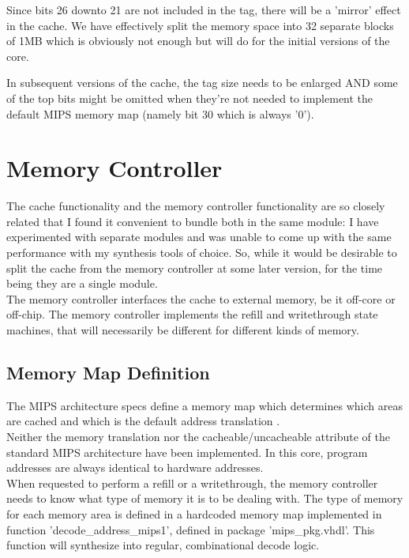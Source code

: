     Since bits 26 downto 21 are not included in the tag, there will be a 
    'mirror' effect in the cache. We have effectively split the memory space 
    into 32 separate blocks of 1MB which is obviously not enough but will do
    for the initial versions of the core.
    
    In subsequent versions of the cache, the tag size needs to be enlarged AND 
    some of the top bits might be omitted when they're not needed to implement 
    the default MIPS memory map (namely bit 30 which is always '0').

    
\section{Memory Controller}
\label{memory_controller}

    The cache functionality and the memory controller functionality are so 
    closely related that I found it convenient to bundle both in the same 
    module: I have experimented with separate modules and was unable to come up
    with the same performance with my synthesis tools of choice.
    So, while it would be desirable to split the cache from the memory controller
    at some later version, for the time being they are a single module.\\

    The memory controller interfaces the cache to external memory, be it off-core 
    or off-chip.
    The memory controller implements the refill and writethrough state machines,
    that will necessarily be different for different kinds of memory.\\


\subsection{Memory Map Definition}
\label{memory_map_definition}    
    
    The MIPS architecture specs define a memory map which determines which areas
    are cached and which is the default address translation \cite[p.~2-8]{r3k_ref_man}.\\
    Neither the memory translation nor the cacheable/uncacheable attribute of
    the standard MIPS architecture have been implemented. In this core, program 
    addresses are always identical to hardware addresses.\\

    When requested to perform a refill or a writethrough, the memory controller 
    needs to know what type of memory it is to be dealing with. The type of
    memory for each memory area is defined in a hardcoded memory map 
    implemented in function 'decode\_address\_mips1', defined in package 
    'mips\_pkg.vhdl'. This function will synthesize into regular, combinational 
    decode logic.\\

